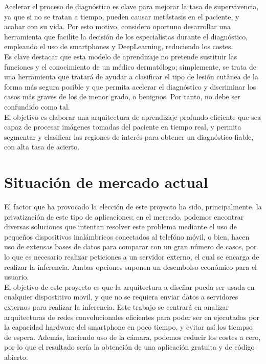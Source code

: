 Acelerar el proceso de diagnóstico es clave para mejorar la tasa de supervivencia, ya que si no se tratan a tiempo, pueden causar metástasis en el paciente, y acabar con su vida. Por esto motivo, considero oportuno desarrollar una herramienta que facilite la decisión de los especialistas durante el diagnóstico, empleando el uso de smartphones y DeepLearning, reduciendo los costes.\\

Es clave destacar que esta modelo de aprendizaje no pretende sustituir las funciones y el conocimiento de un médico dermatólogo; simplemente, se trata de una herramienta que tratará de ayudar a clasificar el tipo de lesión cutánea de la forma más segura posible y que permita acelerar el diagnóstico y discriminar los casos más graves de los de menor grado, o benignos. Por tanto, no debe ser confundido como tal.\\

El objetivo es elaborar una arquitectura de aprendizaje profundo eficiente que sea capaz de procesar imágenes tomadas del paciente en tiempo real, y permita segmentar y clasificar las regiones de interés para obtener un diagnóstico fiable, con alta tasa de acierto.

\section{Situación de mercado actual}

El factor que ha provocado la elección de este proyecto ha sido, principalmente, la privatización de este tipo de aplicaciones; en el mercado, podemos encontrar diversas soluciones que intentan resolver este problema mediante el uso de pequeños dispositivos inalámbricos conectados al telefóno móvil, o bien, hacen uso de extensas bases de datos para comparar con un gran número de casos, por lo que es necesario realizar peticiones a un servidor externo, el cual se encarga de realizar la inferencia. Ambas opciones suponen un desembolso económico para el usuario.\\

El objetivo de este proyecto es que la arquitectura a diseñar pueda ser usada en cualquier dispostitivo movil, y que no se requiera enviar datos a servidores externos para realizar la inferencia. Este trabajo se centrará en analizar arquitecturas de redes convolucionales eficientes para poder ser en ejecutadas por la capacidad hardware del smartphone en poco tiempo, y evitar así los tiempso de espera. Además, haciendo uso de la cámara, podemos reducir los costes a cero, por lo que el resultado sería la obtención de una aplicación gratuita y de código abierto.

